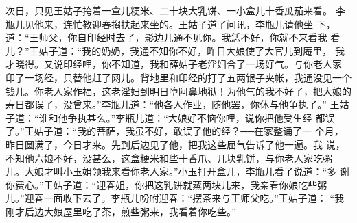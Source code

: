 次日，只见王姑子挎着一盒儿粳米、二十块大乳饼、一小盒儿十香瓜茄来看。
李瓶儿见他来，连忙教迎春搊扶起来坐的。王姑子道了问讯，李瓶儿请他坐
下，道：“王师父，你自印经时去了，影边儿通不见你。我恁不好，你就不来看我
看儿？”王姑子道：“我的奶奶，我通不知你不好，昨日大娘使了大官儿到庵里，
我才晓得。又说印经哩，你不知道，我和薛姑子老淫妇合了一场好气。与你老人家
印了一场经，只替他赶了网儿。背地里和印经的打了五两银子夹帐，我通没见一个
钱儿。你老人家作福，这老淫妇到明日堕阿鼻地狱！为他气的我不好了，把大娘的
寿日都误了，没曾来。”李瓶儿道：“他各人作业，随他罢，你休与他争执了。”
王姑子道：“谁和他争执甚么。”李瓶儿道：“大娘好不恼你哩，说你把他受生经
都误了。”王姑子道：“我的菩萨，我虽不好，敢误了他的经？──在家整诵了一
个月，昨日圆满了，今日才来。先到后边见了他，把我这些屈气告诉了他一遍。我
说，不知他六娘不好，没甚么，这盒粳米和些十香爪、几块乳饼，与你老人家吃粥
儿。大娘才叫小玉姐领我来看你老人家。”小玉打开盒儿，李瓶儿看了说道：“多
谢你费心。”王姑子道：“迎春姐，你把这乳饼就蒸两块儿来，我亲看你娘吃些粥
儿。”迎春一面收下去了。李瓶儿吩咐迎春：“摆茶来与王师父吃。”王姑子道：
“我刚才后边大娘屋里吃了茶，煎些粥来，我看着你吃些。”

